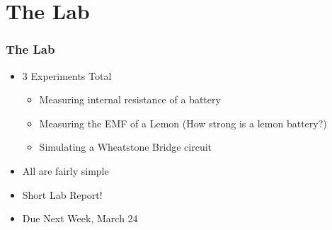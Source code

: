 \documentclass{beamer}
\theoremstyle{remark}
\begin{document}
\section{The Lab}
\begin{frame}
  \frametitle{The Lab}
  \begin{itemize}
  \item 3 Experiments Total
    \begin{itemize}
    \item Measuring internal resistance of a battery
    \item Measuring the EMF of a Lemon (How strong is a lemon battery?)
    \item Simulating a Wheatstone Bridge circuit
    \end{itemize}
  \item All are fairly simple
  \item Short Lab Report!
  \item Due Next Week, March 24
  \end{itemize}
\end{frame}
\end{document}
